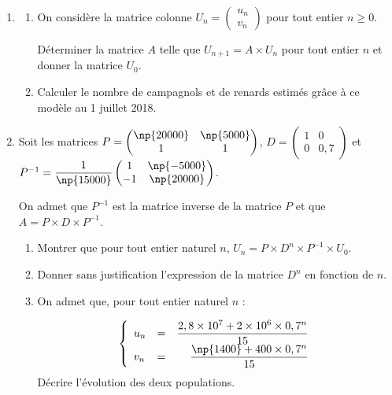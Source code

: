 \documentclass[10pt,a4paper]{article}
\begin{document}
\begin{enumerate}
\item 
	\begin{enumerate}
		\item On considère la matrice colonne $U_n = \begin{pmatrix}u_n\\v_n\end{pmatrix}$ pour tout entier $n \geqslant 0$.
		
Déterminer la matrice $A$ telle que $U_{n+1} = A \times U_n$ pour tout entier $n$ et donner la matrice $U_0$.
		\item Calculer le nombre de campagnols et de renards estimés grâce à ce modèle au 1 juillet
2018.
	\end{enumerate}
\item Soit les matrices $P = \begin{pmatrix}\np{20000}&\np{5000}\\1&1\end{pmatrix}$, \:$D = \begin{pmatrix}1&0\\0&0,7\end{pmatrix}$ et $P^{-1} = \dfrac{1}{\np{15000}}\begin{pmatrix}1& \np{-5000}\\- 1&\np{20000}\end{pmatrix}$.
	
On admet que $P^{- 1}$ est la matrice inverse de la matrice $P$ et que $A = P \times D \times P^{- 1}$.
	\begin{enumerate}
		\item Montrer que pour tout entier naturel $n$,\: $U_n = P \times D^n \times P^{- 1} \times U_0$.
		\item Donner sans justification l'expression de la matrice $D^n$ en fonction de $n$.
		\item On admet que, pour tout entier naturel $n$ :
	
\renewcommand\arraystretch{1.8}	
\[\left\{\begin{array}{l c r}
u_n &=& \dfrac{2,8 \times 10^7 + 2 \times 10^6 \times 0,7^n}{15}\\

v_n &=&\dfrac{\np{1400} + 400 \times 0,7^n}{15}
		\end{array}\right.\]
\renewcommand\arraystretch{1}	
Décrire l'évolution des deux populations.
	\end{enumerate}
\end{enumerate}
\end{document}
